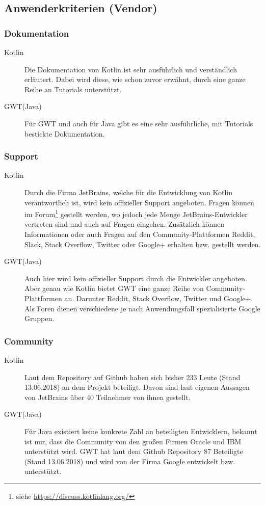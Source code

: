 \subsection{Anwenderkriterien (Vendor)}
\subsubsection{Dokumentation}
\begin{description}
	\item[Kotlin] Die Dokumentation von Kotlin ist sehr ausführlich und verständlich erläutert. Dabei wird diese, wie schon zuvor erwähnt, durch eine ganze Reihe an Tutorials unterstützt. \cite{kotlinReference}
	\item[GWT(Java)] Für \gls{GWT} und auch für Java gibt es eine sehr ausführliche, mit Tutorials bestickte Dokumentation. \cite{gwtDevGuide, javaDoc}
\end{description}

\subsubsection{Support}
\begin{description}
	\item[Kotlin] Durch die Firma JetBrains, welche für die Entwicklung von Kotlin verantwortlich ist, wird kein offizieller Support angeboten. Fragen können im Forum\footnote{siehe \url{https://discuss.kotlinlang.org/}} gestellt werden, wo jedoch jede Menge JetBrains-Entwickler vertreten sind und auch auf Fragen eingehen. Zusätzlich können Informationen oder auch Fragen auf den Community-Plattformen Reddit, Slack, Stack Overflow, Twitter oder Google+ erhalten bzw. gestellt werden. \cite{kotlinCommunity}
	\item[GWT(Java)] Auch hier wird kein offizieller Support durch die Entwickler angeboten. Aber genau wie Kotlin bietet \gls{GWT} eine ganze Reihe von Community-Plattformen an. Darunter Reddit, Stack Overflow, Twitter und Google+. Als Foren dienen verschiedene je nach Anwendungsfall spezialisierte Google Gruppen. \cite{gwtCommunity}
\end{description}

\subsubsection{Community}
\begin{description}
	\item[Kotlin] Laut dem Repository auf Github haben sich bisher 233 Leute (Stand 13.06.2018) an dem Projekt beteiligt. Davon sind laut eigenen Aussagen von JetBrains über 40 Teilnehmer von ihnen gestellt. \cite{kotlinWhoDevelops}
	\item[GWT(Java)] Für Java existiert keine konkrete Zahl an beteiligten Entwicklern, bekannt ist nur, dass die Community von den großen Firmen Oracle und IBM unterstützt wird. \gls{GWT} hat laut dem Github Repository 87 Beteiligte (Stand 13.06.2018) und wird von der Firma Google entwickelt bzw. unterstützt. \cite{oracleIBMCollaborate, gwtTerms}
\end{description}


